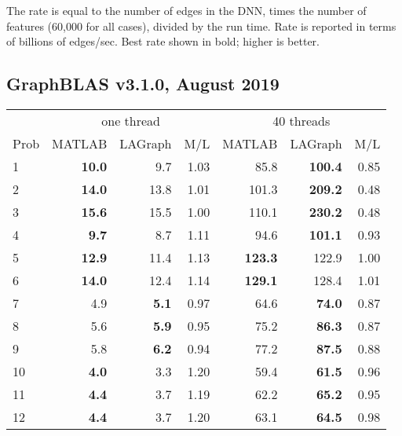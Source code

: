 \documentclass[12pt]{article}
\begin{document}
The rate is equal to the number of edges in the DNN, times the number of
features (60,000 for all cases), divided by the run time.  Rate is reported
in terms of billions of edges/sec.  Best rate shown in bold; higher is better.

\subsection{GraphBLAS v3.1.0, August 2019}

{\small
\begin{tabular}{l|rr|r||rr|r}
\hline
     & \multicolumn{3}{c}{one thread}                &  \multicolumn{3}{c}{40 threads}  \\
Prob & MATLAB         & LAGraph        & M/L         &   MATLAB      & LAGraph       & M/L        \\
\hline
  1  &{\bf      10.0 }&           9.7  &       1.03  &  {      85.8 }& {\bf   100.4 }&     0.85   \\
  2  &{\bf      14.0 }&          13.8  &       1.01  &  {     101.3 }& {\bf   209.2 }&     0.48   \\
  3  &{\bf      15.6 }&          15.5  &       1.00  &  {     110.1 }& {\bf   230.2 }&     0.48   \\
\hline
  4  &{\bf       9.7 }&           8.7  &       1.11  &  {      94.6 }& {\bf   101.1 }&     0.93   \\
  5  &{\bf      12.9 }&          11.4  &       1.13  &  {\bf  123.3 }& {      122.9 }&     1.00   \\
  6  &{\bf      14.0 }&          12.4  &       1.14  &  {\bf  129.1 }& {      128.4 }&     1.01   \\
\hline
  7  &           4.9  & {\bf      5.1 }&       0.97  &  {      64.6 }& {\bf    74.0 }&     0.87   \\
  8  &           5.6  & {\bf      5.9 }&       0.95  &  {      75.2 }& {\bf    86.3 }&     0.87   \\
  9  &           5.8  & {\bf      6.2 }&       0.94  &  {      77.2 }& {\bf    87.5 }&     0.88   \\
\hline
 10  &{\bf       4.0 }&           3.3  &       1.20  &  {      59.4 }& {\bf    61.5 }&     0.96   \\
 11  &{\bf       4.4 }&           3.7  &       1.19  &  {      62.2 }& {\bf    65.2 }&     0.95   \\
 12  &{\bf       4.4 }&           3.7  &       1.20  &  {      63.1 }& {\bf    64.5 }&     0.98   \\
\end{tabular}
}
\end{document}
